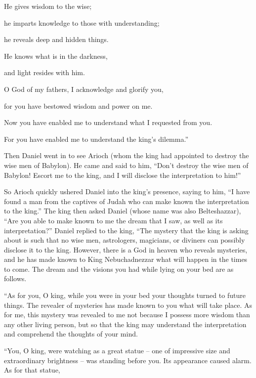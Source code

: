 {\par }{\Q He gives
wisdom
to the wise;
\par }{\Q he imparts
knowledge
to those with understanding;
\par }{\Q {}he reveals
deep
and hidden things.
\par }{\Q He knows
what
is in the darkness,
\par }{\Q and light
resides
with him.
\par }{\Q {}O God
of my fathers,
I acknowledge
and glorify
you,
\par }{\Q for
you have bestowed
wisdom
and power
on me.
\par }{\Q Now
you have enabled me to understand
what
I requested
from
you.
\par }{\Q For
you have enabled me to understand
the king’s
dilemma.”
\par }{\PP {}Then
Daniel
went in
to
see Arioch
(whom
the king
had appointed
to destroy
the wise men
of Babylon). He came
and
said
to him, “Don’t
destroy
the wise men
of Babylon! Escort
me to
the king,
and I will disclose
the interpretation
to him!”
\par }{\PP {}So
Arioch
quickly
ushered
Daniel
into
the king’s
presence,
saying
to him, “I have found
a man
from
the captives
of Judah
who
can make known
the interpretation
to the king.”
The king
then asked
Daniel
(whose
name
was also Belteshazzar), “Are
you able
to make known
to me the dream
that
I saw,
as well as its interpretation?”
Daniel
replied
to
the king,
“The mystery
that
the king
is asking
about is such that no
wise men,
astrologers,
magicians,
or diviners
can
possibly disclose
it to the king.
However,
there is
a God
in heaven
who reveals
mysteries,
and he has made known
to King
Nebuchadnezzar
what
will happen
in the times
to come.
The dream
and the visions
you had while lying on
your bed
are
as follows.
\par }{\PP {}“As for you,
O king,
while you were in
your bed
your thoughts
turned
to future
things. The revealer
of mysteries
has made known
to you what
will take place.
As for me,
this
mystery
was revealed
to me not
because
I possess
more wisdom
than
any
other living person,
but
so that
the king
may understand
the interpretation
and comprehend
the thoughts
of your mind.
\par }{\PP {}“You,
O king,
were
watching
as
a great
statue
– one
of impressive size
and extraordinary
brightness
– was standing before
you. Its appearance
caused
alarm.
As for that statue,
}
